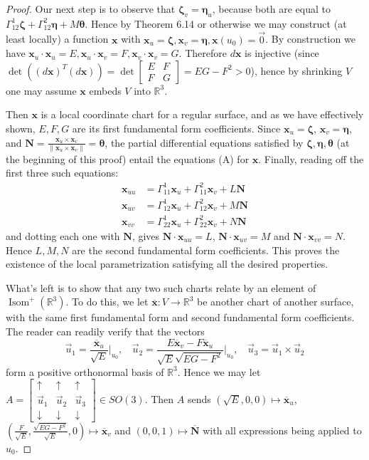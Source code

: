 \documentclass[leqno]{book}
\begin{document}
\begin{proof}
Our next step is to observe that $\boldsymbol\zeta_v=\boldsymbol\eta_u$, because both are equal to $\Gamma_{12}^1\boldsymbol\zeta+\Gamma_{12}^2\boldsymbol\eta+M\boldsymbol\theta$.  Hence by Theorem 6.14 or otherwise we may construct (at least locally) a function $\mathbf x$ with $\mathbf x_u=\boldsymbol\zeta,\mathbf x_v=\boldsymbol\eta,\mathbf x(u_0)=\vec 0$.  By construction we have $\mathbf x_u\cdot\mathbf x_u=E,\mathbf x_u\cdot\mathbf x_v=F,\mathbf x_v\cdot\mathbf x_v=G$.  Therefore $d\mathbf x$ is injective (since $\det((d\mathbf x)^T(d\mathbf x))=\det\begin{bmatrix}E&F\\F&G\end{bmatrix}=EG-F^2>0$), hence by shrinking $V$ one may assume $\mathbf x$ embeds $V$ into $\mathbb R^3$.

Then $\mathbf x$ is a local coordinate chart for a regular surface, and as we have effectively shown, $E,F,G$ are its first fundamental form coefficients.  Since $\mathbf x_u=\boldsymbol\zeta$, $\mathbf x_v=\boldsymbol\eta$, and $\mathbf N=\frac{\mathbf x_u\times\mathbf x_v}{\|\mathbf x_u\times\mathbf x_v\|}=\boldsymbol\theta$, the partial differential equations satisfied by $\boldsymbol\zeta,\boldsymbol\eta,\boldsymbol\theta$ (at the beginning of this proof) entail the equations (A) for $\mathbf x$.  Finally, reading off the first three such equations:
\begin{align*}
\mathbf x_{uu}&=\Gamma_{11}^1\mathbf x_u+\Gamma_{11}^2\mathbf x_v+L\mathbf N\\
\mathbf x_{uv}&=\Gamma_{12}^1\mathbf x_u+\Gamma_{12}^2\mathbf x_v+M\mathbf N\\
\mathbf x_{vv}&=\Gamma_{22}^1\mathbf x_u+\Gamma_{22}^2\mathbf x_v+N\mathbf N
\end{align*}
and dotting each one with $\mathbf N$, gives $\mathbf N\cdot\mathbf x_{uu}=L$, $\mathbf N\cdot\mathbf x_{uv}=M$ and $\mathbf N\cdot\mathbf x_{vv}=N$.  Hence $L,M,N$ are the second fundamental form coefficients.  This proves the existence of the local parametrization satisfying all the desired properties.

What's left is to show that any two such charts relate by an element of $\operatorname{Isom}^+(\mathbb R^3)$.  To do this, we let $\overline{\mathbf x}:V\to\mathbb R^3$ be another chart of another surface, with the same first fundamental form and second fundamental form coefficients.  The reader can readily verify that the vectors
$$\vec u_1=\frac{\overline{\mathbf x}_u}{\sqrt E}\big|_{u_0},~~~~\vec u_2=\frac{E\overline{\mathbf x}_v-F\overline{\mathbf x}_u}{\sqrt E\sqrt{EG-F^2}}\big|_{u_0},~~~~\vec u_3=\vec u_1\times\vec u_2$$
form a positive orthonormal basis of $\mathbb R^3$.  Hence we may let $A=\begin{bmatrix}\uparrow&\uparrow&\uparrow\\\vec u_1&\vec u_2&\vec u_3\\\downarrow&\downarrow&\downarrow\end{bmatrix}\in SO(3)$.  Then $A$ sends $(\sqrt E,0,0)\mapsto\overline{\mathbf x}_u$, $\left(\frac F{\sqrt E},\frac{\sqrt{EG-F^2}}{\sqrt E},0\right)\mapsto\overline{\mathbf x}_v$ and $(0,0,1)\mapsto\overline{\mathbf N}$ with all expressions being applied to $u_0$.


\end{proof}
\end{document}
